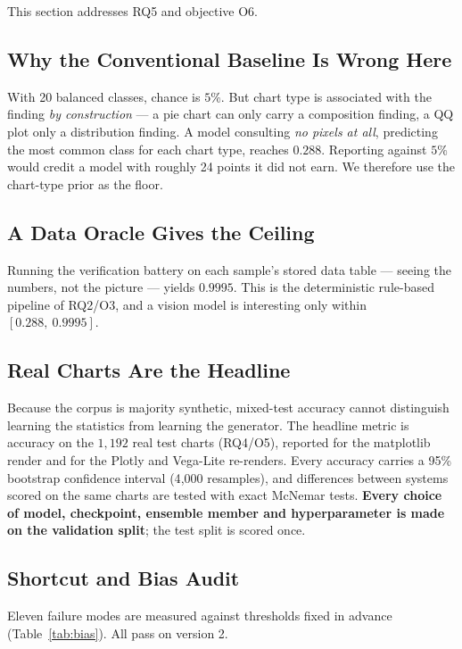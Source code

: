 This section addresses RQ5 and objective O6.

\subsection{Why the Conventional Baseline Is Wrong Here}

With 20 balanced classes, chance is $5\%$. But chart type is associated with the
finding \emph{by construction} --- a pie chart can only carry a composition
finding, a QQ plot only a distribution finding. A model consulting \emph{no pixels
at all}, predicting the most common class for each chart type, reaches
$\mathbf{0.288}$. Reporting against $5\%$ would credit a model with roughly 24
points it did not earn. We therefore use the chart-type prior as the floor.

\subsection{A Data Oracle Gives the Ceiling}

Running the verification battery on each sample's stored data table --- seeing the
numbers, not the picture --- yields $\mathbf{0.9995}$. This is the deterministic
rule-based pipeline of RQ2/O3, and a vision model is interesting only within
$[0.288,\ 0.9995]$.

\subsection{Real Charts Are the Headline}

Because the corpus is majority synthetic, mixed-test accuracy cannot distinguish
learning the statistics from learning the generator. The headline metric is accuracy
on the $1{,}192$ real test charts (RQ4/O5), reported for the matplotlib render and for
the Plotly and Vega-Lite re-renders. Every accuracy carries a 95\% bootstrap confidence
interval (4{,}000 resamples), and differences between systems scored on the same
charts are tested with exact McNemar tests. \textbf{Every choice of model, checkpoint,
ensemble member and hyperparameter is made on the validation split}; the test split is
scored once.

\subsection{Shortcut and Bias Audit}

Eleven failure modes are measured against thresholds fixed in advance
(Table~\ref{tab:bias}). All pass on version 2.


